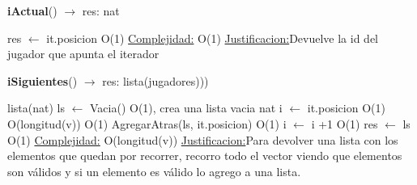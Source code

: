 \begin{Algoritmos}
\begin{algorithm}[H]{\textbf{iActual}() $\to$ res: nat}
	\begin{algorithmic}[1]
		\State res $\gets$ it.posicion \Comment O(1)
		\medskip
		\Statex \underline{Complejidad:} O(1)
		\Statex \underline{Justificacion:}Devuelve la id del jugador que apunta el iterador  
	\end{algorithmic}
\end{algorithm}
	
\begin{algorithm}[H]{\textbf{iSiguientes}() $\to$ res: lista(jugadores)))}
	\begin{algorithmic}[1]
		\State lista(nat) ls $\gets$ Vacia() \Comment O(1), crea una lista vacia
		\State nat i $\gets$ it.posicion \Comment O(1)
		 \Comment O(longitud(v))
			 \Comment O(1)
				\State AgregarAtras(ls, it.posicion) \Comment O(1)
			\EndIf
		\State i $\gets$ i +1 \Comment O(1)		
		\EndWhile
		\State res $\gets$ ls \Comment O(1)
		\medskip
		\Statex \underline{Complejidad:} O(longitud(v))
		\Statex \underline{Justificacion:}Para devolver una lista con los elementos que quedan por recorrer, recorro todo el vector viendo que elementos son válidos y si un elemento es válido lo agrego a una lista.
	\end{algorithmic}
\end{algorithm}

\end{Algoritmos}
